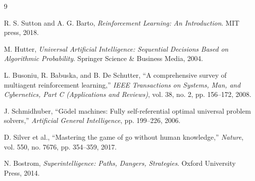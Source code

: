 \documentclass[12pt,a4paper]{article}
\begin{document}

\begin{thebibliography}{9}

R. S. Sutton and A. G. Barto, \textit{Reinforcement Learning: An Introduction}. MIT press, 2018.

M. Hutter, \textit{Universal Artificial Intelligence: Sequential Decisions Based on Algorithmic Probability}. Springer Science \& Business Media, 2004.

L. Busoniu, R. Babuska, and B. De Schutter, ``A comprehensive survey of multiagent reinforcement learning,'' \textit{IEEE Transactions on Systems, Man, and Cybernetics, Part C (Applications and Reviews)}, vol. 38, no. 2, pp. 156--172, 2008.

J. Schmidhuber, ``G\"odel machines: Fully self-referential optimal universal problem solvers,'' \textit{Artificial General Intelligence}, pp. 199--226, 2006.

D. Silver et al., ``Mastering the game of go without human knowledge,'' \textit{Nature}, vol. 550, no. 7676, pp. 354--359, 2017.

N. Bostrom, \textit{Superintelligence: Paths, Dangers, Strategies}. Oxford University Press, 2014.

\end{thebibliography}
\end{document}

